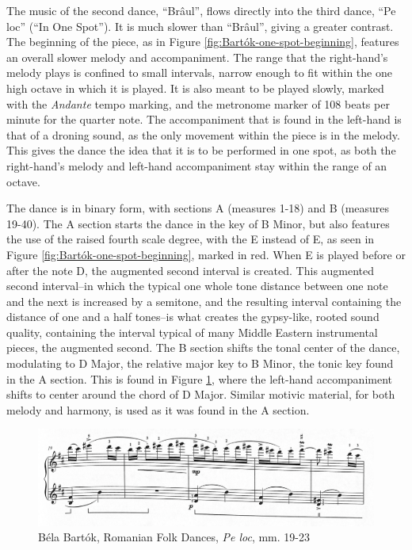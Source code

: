 The music of the second dance, ``Brâul'', flows directly into the third dance, ``Pe loc'' (``In One Spot''). It is much slower than ``Brâul'', giving a greater contrast. The beginning of the piece, as in Figure \ref{fig:Bartók-one-spot-beginning}\autocite{Lung_2016}, features an overall slower melody and accompaniment. The range that the right-hand's melody plays is confined to small intervals, narrow enough to fit within the one high octave in which it is played. It is also meant to be played slowly, marked with the \textit{Andante} tempo marking, and the metronome marker of 108 beats per minute for the quarter note. The accompaniment that is found in the left-hand is that of a droning sound, as the only movement within the piece is in the melody. This gives the dance the idea that it is to be performed in one spot, as both the right-hand's melody and left-hand accompaniment stay within the range of an octave.

The dance is in binary form, with sections A (measures 1-18) and B (measures 19-40). The A section starts the dance in the key of B Minor, but also features the use of the raised fourth scale degree, with the E\musSharp{} instead of E, as seen in Figure \ref{fig:Bartók-one-spot-beginning}\autocite{Lung_2016}, marked in red. When E\musSharp{} is played before or after the note D, the augmented second interval is created. This augmented second interval--in which the typical one whole tone distance between one note and the next is increased by a semitone, and the resulting interval containing the distance of one and a half tones--is what creates the gypsy-like, rooted sound quality, containing the interval typical of many Middle Eastern instrumental pieces, the augmented second. The B section shifts the tonal center of the dance, modulating to D Major, the relative major key to B Minor, the tonic key found in the A section. This is found in Figure \ref{fig:Bartók-one-spot-b-section}\autocite{Lung_2016}, where the left-hand accompaniment shifts to center around the chord of D Major. Similar motivic material, for both melody and harmony, is used as it was found in the A section.

\begin{figure}[h]
  \centering
  \includegraphics[width=\textwidth]{figures/bartok-one-spot-b-section.jpg}
  \caption{Béla Bartók, Romanian Folk Dances, \textit{Pe loc}, mm. 19-23}
  \label{fig:Bartók-one-spot-b-section}
\end{figure}

